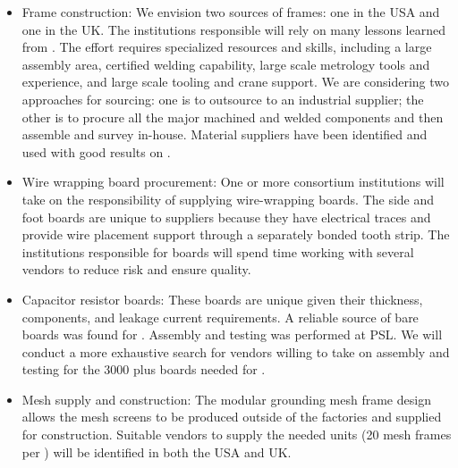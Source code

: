 \begin{itemize}

\item Frame construction: We envision two sources of frames: one in the USA and one in the UK. The institutions responsible will rely on many lessons learned from . The effort requires specialized resources and skills, including a large assembly area, certified welding capability, large scale metrology tools and experience, and large scale tooling and crane support. We are considering two approaches for sourcing: one is to outsource to an industrial supplier; the other is to procure all the major machined and welded components and then assemble and survey in-house. Material suppliers have been identified and used with good results on .

\item Wire wrapping board procurement: One or more consortium institutions will take on the responsibility of supplying wire-wrapping boards. The side and foot boards are unique to suppliers because they have electrical traces and provide wire placement support through a separately bonded tooth strip. %
The institutions responsible for boards will spend time working with several vendors to reduce risk and ensure quality. 

\item Capacitor resistor boards: These boards are unique given their thickness, 
 components, and leakage current requirements. A reliable source of bare boards was found for . Assembly and testing was performed at PSL. We will conduct a more exhaustive search for vendors willing to take on assembly and testing for the \num{3000} plus boards needed for .

\item Mesh supply and construction: The modular grounding mesh frame design allows the mesh screens to be produced outside of the factories and supplied for  construction.  Suitable vendors to supply the needed units (20 mesh frames per ) will be identified in both the USA and UK.   %


\end{itemize}
